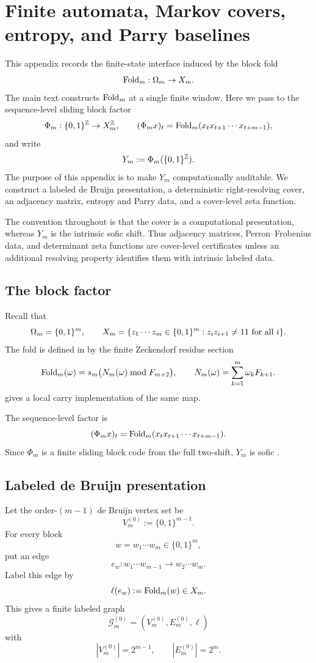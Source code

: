 \section{Finite automata, Markov covers, entropy, and Parry baselines}
\label{app:finite-state-audit}

This appendix records the finite-state interface induced by the block fold
\[
\operatorname{Fold}_m:\Omega_m\to X_m.
\]
The main text constructs \(\operatorname{Fold}_m\) at a single finite window.  Here we pass to the sequence-level sliding block factor
\[
\Phi_m:\{0,1\}^{\mathbb{Z}}\to X_m^{\mathbb{Z}},
\qquad
(\Phi_m x)_t=\operatorname{Fold}_m(x_tx_{t+1}\cdots x_{t+m-1}),
\]
and write
\[
Y_m:=\Phi_m(\{0,1\}^{\mathbb{Z}}).
\]
The purpose of this appendix is to make \(Y_m\) computationally auditable.  We construct a labeled de Bruijn presentation, a deterministic right-resolving cover, an adjacency matrix, entropy and Parry data, and a cover-level zeta function.

The convention throughout is that the cover is a computational presentation, whereas \(Y_m\) is the intrinsic sofic shift.  Thus adjacency matrices, Perron--Frobenius data, and determinant zeta functions are cover-level certificates unless an additional resolving property identifies them with intrinsic labeled data.

\subsection{The block factor}

Recall that
\[
\Omega_m=\{0,1\}^m,
\qquad
X_m=\{z_1\cdots z_m\in\{0,1\}^m:z_iz_{i+1}\neq 11\text{ for all }i\}.
\]
The fold is defined in  by the finite Zeckendorf residue section
\[
\operatorname{Fold}_m(\omega)=s_m\bigl(N_m(\omega)\bmod F_{m+2}\bigr),
\qquad
N_m(\omega)=\sum_{k=1}^m\omega_kF_{k+1}.
\]
 gives a local carry implementation of the same map.

The sequence-level factor is
\[
(\Phi_m x)_t=\operatorname{Fold}_m(x_tx_{t+1}\cdots x_{t+m-1}).
\]
Since \(\Phi_m\) is a finite sliding block code from the full two-shift, \(Y_m\) is sofic \cite{LindMarcus1995}.

\subsection{Labeled de Bruijn presentation}

Let the order-\((m-1)\) de Bruijn vertex set be
\[
V_m^{(0)}:=\{0,1\}^{m-1}.
\]
For every block
\[
w=w_1\cdots w_m\in\{0,1\}^m,
\]
put an edge
\[
e_w:w_1\cdots w_{m-1}\longrightarrow w_2\cdots w_m.
\]
Label this edge by
\[
\ell(e_w):=\operatorname{Fold}_m(w)\in X_m.
\]
This gives a finite labeled graph
\[
\mathcal G_m^{(0)}=(V_m^{(0)},E_m^{(0)},\ell)
\]
with
\[
|V_m^{(0)}|=2^{m-1},
\qquad
|E_m^{(0)}|=2^m.
\]

